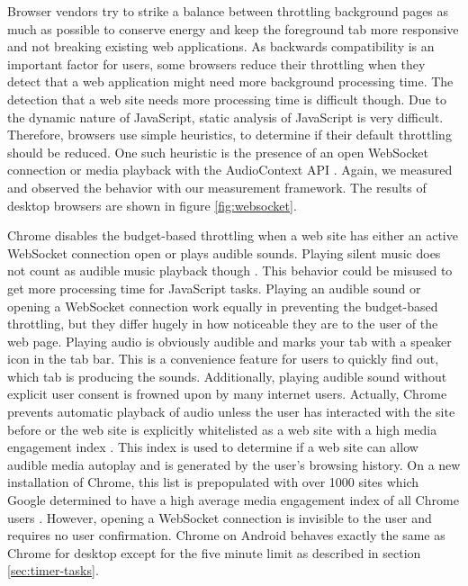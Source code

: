 \documentclass[
	ruledheaders=section,%
	class=report,%
	thesis={type=bachelor},%
	accentcolor=9c,%
	custommargins=true,%
	marginpar=false,%
	parskip=half-,%
	fontsize=11pt,%
]{tudapub}
\begin{document}
  Browser vendors try to strike a balance between throttling background pages as much as possible to conserve energy and keep the foreground tab more responsive and not breaking existing web applications. As backwards compatibility is an important factor for users, some browsers reduce their throttling when they detect that a web application might need more background processing time. The detection that a web site needs more processing time is difficult though. Due to the dynamic nature of JavaScript, static analysis of JavaScript is very difficult. Therefore, browsers use simple heuristics, to determine if their default throttling should be reduced. One such heuristic is the presence of an open WebSocket connection \cite{mdn-websocket} or media playback with the AudioContext API \cite{mdn-audiocontext}. Again, we measured and observed the behavior with our measurement framework. The results of desktop browsers are shown in figure \ref{fig:websocket}.

  Chrome disables the budget-based throttling when a web site has either an active WebSocket connection open or plays audible sounds. Playing silent music does not count as audible music playback though \cite{chrome-background-tabs}. This behavior could be misused to get more processing time for JavaScript tasks. Playing an audible sound or opening a WebSocket connection work equally in preventing the budget-based throttling, but they differ hugely in how noticeable they are to the user of the web page. Playing audio is obviously audible and marks your tab with a speaker icon in the tab bar. This is a convenience feature for users to quickly find out, which tab is producing the sounds. Additionally, playing audible sound without explicit user consent is frowned upon by many internet users. Actually, Chrome prevents automatic playback of audio unless the user has interacted with the site before or the web site is explicitly whitelisted as a web site with a high media engagement index \cite{chrome-media-engagement-index}. This index is used to determine if a web site can allow audible media autoplay and is generated by the user's browsing history. On a new installation of Chrome, this list is prepopulated with over 1000 sites which Google determined to have a high average media engagement index of all Chrome users \cite{chrome-autoplay}. However, opening a WebSocket connection is invisible to the user and requires no user confirmation. Chrome on Android behaves exactly the same as Chrome for desktop except for the five minute limit as described in section \ref{sec:timer-tasks}.
\end{document}
